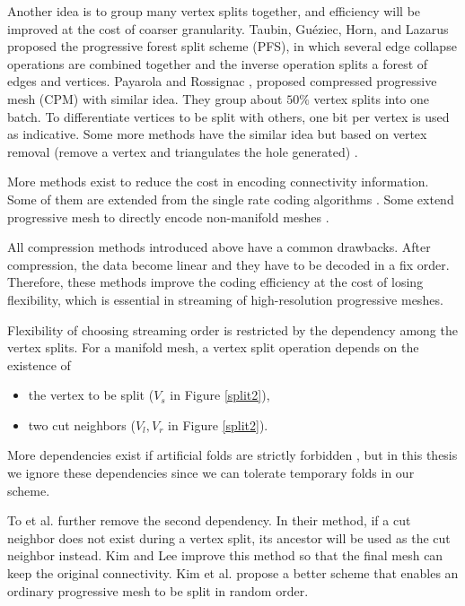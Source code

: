 \documentclass[11pt, a4paper]{report}
\begin{document}
    Another idea is to group many vertex splits together, 
    and efficiency will be improved at the cost of coarser granularity. 
    Taubin, Gu\'{e}ziec, Horn, and Lazarus \cite{280834} proposed the
    progressive forest split scheme (PFS), in which several edge
    collapse operations are combined together and the inverse operation splits a
    forest of edges and vertices. 
    Payarola and Rossignac \cite{614450}, 
    proposed compressed progressive mesh (CPM)\label{cpm} with similar
    idea. They group about $50\%$ vertex splits into one batch. To
    differentiate vertices to be split with others, one bit per vertex
    is used as indicative. 
    Some more methods have the similar idea
    but based on vertex removal (remove a vertex and triangulates the hole
    generated) \cite{319358}. 

    More methods exist to reduce the cost in encoding connectivity information.
    Some of them are extended from the single rate coding algorithms
    \cite{319426, 383281}. Some extend progressive mesh to directly
    encode non-manifold meshes \cite{258852}.

    All compression methods introduced above 
    have a common drawbacks. After compression, the 
    data become linear and they have to be decoded in a fix order. 
    Therefore, these methods improve the coding efficiency at the cost
    of losing flexibility, which is essential in streaming of high-resolution
    progressive meshes.
    
    Flexibility of choosing streaming order 
    is restricted by the dependency among the vertex splits.
    For a manifold mesh, a vertex split operation depends on the existence of
    \begin{itemize}
        \item 
    the vertex to be split ($V_s$ in Figure \ref{split2}), 
        \item 
    two cut neighbors ($V_l, V_r$ in Figure \ref{split2}). 
    \end{itemize}
    More dependencies exist if artificial folds are strictly forbidden \cite{258843, 258847}, 
    but in this thesis we ignore these dependencies since we can 
    tolerate temporary folds in our scheme.
     
    To et al. \cite{To1999} further remove the second dependency.
    In their method, if a cut neighbor does not exist during a vertex split,
    its ancestor will be used as the cut neighbor instead.
    Kim and Lee \cite{kim01truly} improve this method so that the final mesh
    can keep the original connectivity. 
    Kim et al. \cite{multiresolution:kim} propose a better scheme that enables
    an ordinary progressive mesh to be split in random order.
\end{document}
